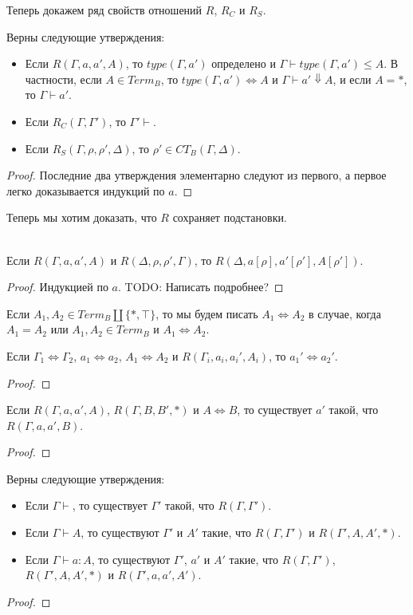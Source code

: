 \documentclass{amsart}
\theoremstyle{definition}
\theoremstyle{remark}
\newcommand{\deq}{\Leftrightarrow}
\numberwithin{figure}{section}
\begin{document}
Теперь докажем ряд свойств отношений $R$, $R_C$ и $R_S$.
\begin{lem}
Верны следующие утверждения:
\begin{itemize}
\item Если $R(\Gamma, a, a', A)$, то $type(\Gamma, a')$ определено и $\Gamma \vdash type(\Gamma, a') \leq A$.
    В частности, если $A \in Term_B$, то $type(\Gamma, a') \deq A$ и $\Gamma \vdash a' \Downarrow A$,
    и если $A = *$, то $\Gamma \vdash a'$.
\item Если $R_C(\Gamma, \Gamma')$, то $\Gamma' \vdash$.
\item Если $R_S(\Gamma, \rho, \rho', \Delta)$, то $\rho' \in CT_B(\Gamma, \Delta)$.
\end{itemize}
\end{lem}
\begin{proof}
Последние два утверждения элементарно следуют из первого, а первое легко доказывается индукций по $a$.
\end{proof}

Теперь мы хотим доказать, что $R$ сохраняет подстановки.
\begin{lem} \ \\
Если $R(\Gamma, a, a', A)$ и $R(\Delta, \rho, \rho', \Gamma)$, то $R(\Delta, a[\rho], a'[\rho'], A[\rho'])$.
\end{lem}
\begin{proof}
Индукцией по $a$. TODO: Написать подробнее?
\end{proof}

Если $A_1, A_2 \in Term_B \amalg \{ *, \top \}$, то мы будем писать $A_1 \deq A_2$ в случае, когда $A_1 = A_2$ или $A_1, A_2 \in Term_B$ и $A_1 \deq A_2$.

\begin{lem}
Если $\Gamma_1 \deq \Gamma_2$, $a_1 \deq a_2$, $A_1 \deq A_2$ и $R(\Gamma_i, a_i, a_i', A_i)$, то $a_1' \deq a_2'$.
\end{lem}
\begin{proof}
\end{proof}

\begin{lem}
Если $R(\Gamma, a, a', A)$, $R(\Gamma, B, B', *)$ и $A \deq B$, то существует $a'$ такой, что $R(\Gamma, a, a', B)$.
\end{lem}
\begin{proof}
\end{proof}

\begin{prop}
Верны следующие утверждения:
\begin{itemize}
\item Если $\Gamma \vdash$, то существует $\Gamma'$ такой, что $R(\Gamma, \Gamma')$.
\item Если $\Gamma \vdash A$, то существуют $\Gamma'$ и $A'$ такие, что $R(\Gamma, \Gamma')$ и $R(\Gamma', A, A', *)$.
\item Если $\Gamma \vdash a : A$, то существуют $\Gamma'$, $a'$ и $A'$ такие, что $R(\Gamma, \Gamma')$, $R(\Gamma', A, A', *)$ и $R(\Gamma', a, a', A')$.
\end{itemize}
\end{prop}
\begin{proof}
\end{proof}
\end{document}
